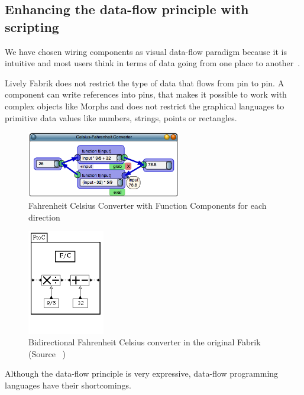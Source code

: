 \documentclass[pdftex, times, 10pt, twocolumn]{article}
\begin{document}
\subsection{Enhancing the data-flow principle with scripting}
We have chosen wiring components as visual data-flow paradigm because it is intuitive and most users think in terms of data going from one place to another~\cite{Baroth1995VPR,Johnston2004ADP}. 

Lively Fabrik does not restrict the type of data that flows from pin to pin. A component can write references into pins, that makes it possible to work with complex objects like Morphs and does not restrict the graphical languages to primitive data values like numbers, strings, points or rectangles.  



\begin{figure}[]\centering
\includegraphics[width=0.600000\textwidth]{FabrikCelsiusFahrenheit.png} 

\caption{Fahrenheit Celsius Converter with Function Components for each direction }
\label{fig:FabrikCelsiusFahrenheit}
\end{figure}


\begin{figure}[]\centering
\includegraphics[width=0.300000\textwidth]{Fabrik_figure2b.png} 

\caption{Bidirectional Fahrenheit Celsius converter in the original Fabrik (Source ~\cite{Ingalls1988FVP}) }
\label{fig:FabrikCelsiusFahrenheitOriginal}
\end{figure}
Although the data-flow principle is very expressive, data-flow programming languages have their shortcomings. 
\end{document}
